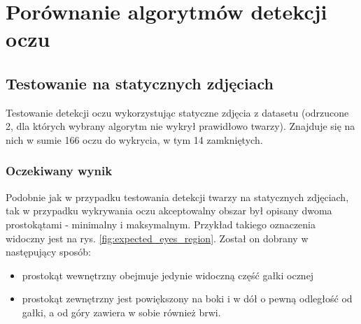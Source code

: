 \newpage

\section{Porównanie algorytmów detekcji oczu}



\subsection{Testowanie na statycznych zdjęciach}

Testowanie detekcji oczu wykorzystując statyczne zdjęcia z datasetu (odrzucone 2, dla których wybrany algorytm nie wykrył prawidłowo twarzy). Znajduje się na nich w sumie 166 oczu do wykrycia, w tym 14 zamkniętych.

\subsubsection{Oczekiwany wynik}
Podobnie jak w przypadku testowania detekcji twarzy na statycznych zdjęciach, tak w przypadku wykrywania oczu akceptowalny obszar był opisany dwoma prostokątami - minimalny i maksymalnym. Przykład takiego oznaczenia widoczny jest na rys. \ref{fig:expected_eyes_region}. Został on dobrany w następujący sposób:
\begin{itemize}
    \item prostokąt wewnętrzny obejmuje jedynie widoczną część gałki ocznej
    \item prostokąt zewnętrzny jest powiększony na boki i w dół o pewną odległość od gałki, a od góry zawiera w sobie również brwi.
\end{itemize}

